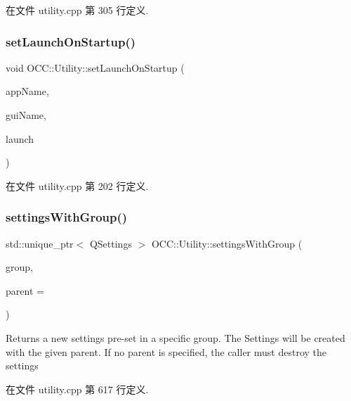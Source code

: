 在文件 utility.\+cpp 第 305 行定义.

\mbox{\label{namespace_o_c_c_1_1_utility_a65ed1f8867bc2161160f62bf07b5fed0}} 
\subsubsection{\texorpdfstring{set\+Launch\+On\+Startup()}{setLaunchOnStartup()}}
{\footnotesize\ttfamily void O\+C\+C\+::\+Utility\+::set\+Launch\+On\+Startup (\begin{DoxyParamCaption}\item[{const Q\+String \&}]{app\+Name,  }\item[{const Q\+String \&}]{gui\+Name,  }\item[{bool}]{launch }\end{DoxyParamCaption})}



在文件 utility.\+cpp 第 202 行定义.

\mbox{\label{namespace_o_c_c_1_1_utility_a769298bacfd2ba51ce868cf9bc62741f}} 
\subsubsection{\texorpdfstring{settings\+With\+Group()}{settingsWithGroup()}}
{\footnotesize\ttfamily std\+::unique\+\_\+ptr$<$ Q\+Settings $>$ O\+C\+C\+::\+Utility\+::settings\+With\+Group (\begin{DoxyParamCaption}\item[{const Q\+String \&}]{group,  }\item[{Q\+Object $\ast$}]{parent = {} }\end{DoxyParamCaption})}

Returns a new settings pre-\/set in a specific group. The Settings will be created with the given parent. If no parent is specified, the caller must destroy the settings 

在文件 utility.\+cpp 第 617 行定义.

\mbox{\label{namespace_o_c_c_1_1_utility_adaea063f9fc0245cd9611c76a0ef38e6}} 
